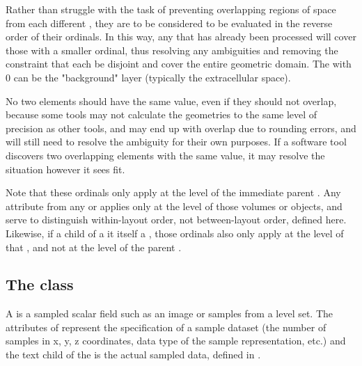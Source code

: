 Rather than struggle with the task of preventing overlapping regions of space from each different \GeometryDefinition, they are to be considered to be evaluated in the reverse order of their ordinals.  In this way, any \GeometryDefinition that has already been processed will cover those with a smaller ordinal, thus resolving any ambiguities and removing the constraint that each \GeometryDefinition be disjoint and cover the entire geometric domain.  The \GeometryDefinition with  0 can be the "background" layer (typically the extracellular space).  

No two \GeometryDefinition elements should have the same  value, even if they should not overlap, because some tools may not calculate the geometries to the same level of precision as other tools, and may end up with overlap due to rounding errors, and will still need to resolve the ambiguity for their own purposes.  If a software tool discovers two overlapping \GeometryDefinition elements with the same  value, it may resolve the situation however it sees fit.

Note that these ordinals only apply at the level of the immediate parent \MixedGeometry.  Any  attribute from any \AnalyticVolume or \CSGObject applies only at the level of those volumes or objects, and serve to distinguish within-\GeometryDefinition layout order, not between-\GeometryDefinition layout order, defined here.  Likewise, if a \GeometryDefinition child of a \MixedGeometry it itself a \MixedGeometry, those ordinals also only apply at the level of that \MixedGeometry, and not at the level of the parent \MixedGeometry.


\subsection{The  class}
\label{sampledfield-class}
A \SampledField is a sampled scalar field such as an image or samples from a level set. The attributes of \SampledField represent the specification of a sample dataset (the number of samples in x, y, z coordinates, data type of the sample representation, etc.) and the text child of the \SampledField is the actual sampled data, defined in .

